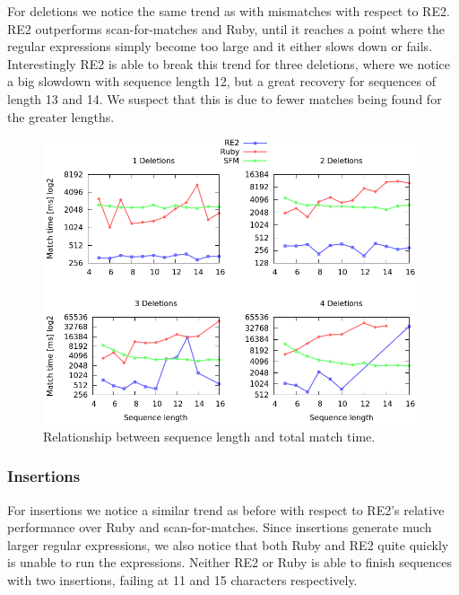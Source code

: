 \documentclass[12pt]{article}
\theoremstyle{definition}
\begin{document}
For deletions we notice the same trend as with mismatches with respect to RE2. RE2 outperforms scan-for-matches and Ruby, until it reaches a point where the regular expressions simply become too large and it either slows down or fails. Interestingly RE2 is able to break this trend for three deletions, where we notice a big slowdown with sequence length 12, but a great recovery for sequences of length 13 and 14. We suspect that this is due to fewer matches being found for the greater lengths.

\begin{figure}[H]
	\begin{center}
		\includegraphics[scale=0.55]{graphs/deletions.png}	
	\end{center}
	\caption{Relationship between sequence length and total match time.}
	\label{graph:cases:deletions}
\end{figure}


\subsubsection{Insertions}

For insertions we notice a similar trend as before with respect to RE2's relative performance over Ruby and scan-for-matches. Since insertions generate much larger regular expressions, we also notice that both Ruby and RE2 quite quickly is unable to run the expressions. Neither RE2 or Ruby is able to finish sequences with two insertions, failing at 11 and 15 characters respectively.
\end{document}
